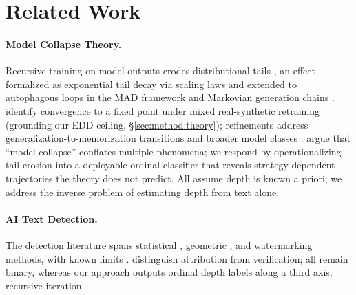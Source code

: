 \section{Related Work}
\label{sec:related}

\paragraph{Model Collapse Theory.}
Recursive training on model outputs erodes distributional tails \cite{shumailov2024_nature}, an effect formalized as exponential tail decay via scaling laws \cite{dohmatob2024_tale_of_tails,seddik2024synthetic} and extended to autophagous loops in the MAD framework \cite{alemohammad2024_mad} and Markovian generation chains \cite{geng2026_markovian}.
\citet{bertrand2024_stability} identify convergence to a fixed point under mixed real-synthetic retraining (grounding our EDD ceiling, \S\ref{sec:method:theory}); refinements address generalization-to-memorization transitions \cite{shi2025_closer_look} and broader model classes \cite{dohmatob2025_strong_collapse}.
\citet{schaeffer2025} argue that ``model collapse'' conflates multiple phenomena; we respond by operationalizing tail-erosion into a deployable ordinal classifier that reveals strategy-dependent trajectories the theory does not predict.
All assume depth is known a priori; we address the inverse problem of estimating depth from text alone.

\paragraph{AI Text Detection.}
The detection literature \cite{wu2025_detection_survey} spans statistical \cite{mitchell2023_detectgpt,fast_detectgpt2024,binoculars2024,gehrmann2019_gltr,verma2024_ghostbuster}, geometric \cite{tulchinskii2023_intrinsic_dim}, and watermarking \cite{kirchenbauer2023_watermark} methods, with known limits \cite{sadasivan2023_paraphrase,pudasaini2026_detection_fails}.
\citet{bevendorff2025_two_paradigms} distinguish attribution from verification; all remain binary, whereas our approach outputs ordinal depth labels along a third axis, recursive iteration.

